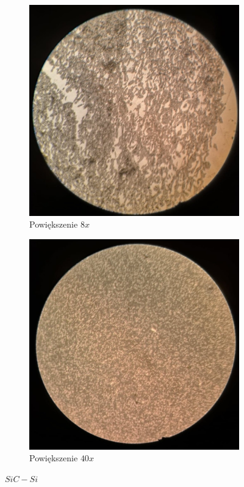 \begin{figure}[H]
    \begin{subfigure}{.5\textwidth}
        \centering
        \includegraphics[width=.8\linewidth]{img/SiC-Si8.jpg}  
        \caption{Powiększenie $8x$}
    \end{subfigure}
    \begin{subfigure}{.5\textwidth}
        \centering
        \includegraphics[width=.8\linewidth]{img/SiC-Si40.jpg}  
        \caption{Powiększenie $40x$}
    \end{subfigure}
    \caption{$SiC-Si$}
\end{figure}


